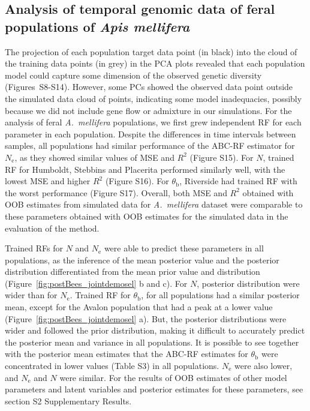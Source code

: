 \documentclass[a4paper, 12pt]{article}
\begin{document}
\subsection*{Analysis of temporal genomic data of feral populations of \textit{Apis mellifera}}

The projection of each population target data point (in black) into the cloud of the training data points (in grey) in the PCA plots revealed that each population model could capture some dimension of the observed genetic diversity (Figures~S8-S14). However, some PCs showed the observed data point outside the simulated data cloud of points, indicating some model inadequacies, possibly because we did not include gene flow or admixture in our simulations. For the analysis of feral \textit{A.\ mellifera} populations, we first grew independent RF for each parameter in each population. Despite the differences in time intervals between samples, all populations had similar performance of the ABC-RF estimator for $N_{\mathrm{e}}$, as they showed similar values of MSE and $R^2$ (Figure S15). For $N$, trained RF for Humboldt, Stebbins and Placerita performed similarly well, with the lowest MSE and higher $R^2$ (Figure S16). For $\theta_\mathrm{b}$, Riverside had trained RF with the worst performance (Figure S17). Overall, both MSE and $R^2$ obtained with OOB estimates from simulated data for \textit{A.\ mellifera} dataset were comparable to these parameters obtained with OOB estimates for the simulated data in the evaluation of the method. 

Trained RFs for $N$ and $N_{\mathrm{e}}$ were able to predict these parameters in all populations, as the inference of the mean posterior value and the posterior distribution differentiated from the mean prior value and distribution (Figure~\ref{fig:postBees_jointdemosel} b and c). For $N$, posterior distribution were wider  than for $N_{\mathrm{e}}$. Trained RF for $\theta_{\mathrm{b}}$, for all populations had a similar posterior mean, except for the Avalon population that had a peak at a lower value (Figure~\ref{fig:postBees_jointdemosel} a). But, the posterior distributions were wider and followed the prior distribution, making it difficult to accurately predict the posterior mean and variance in all populations. It is possible to see together with the posterior mean estimates that the ABC-RF estimates for $\theta_{\mathrm{b}}$ were concentrated in lower values (Table S3) in all populations. $N_{\mathrm{e}}$ were also lower, and $N_{\mathrm{e}}$ and $N$ were similar. For the results of OOB estimates of other model parameters and latent variables and posterior estimates for these parameters, see section S2 Supplementary Results.
\end{document}
